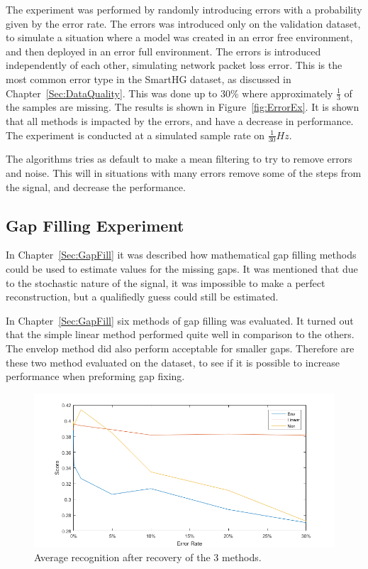 The experiment was performed by randomly introducing errors with a probability given by the error rate. The errors was introduced only on the validation dataset, to simulate a situation where a model was created in an error free environment, and then deployed in an error full environment. The errors is introduced independently of each other, simulating network packet loss error. This is the most common error type in the SmartHG dataset, as discussed in Chapter~\ref{Sec:DataQuality}.  This was done up to 30\% where approximately $\frac{1}{3}$ of the samples are missing. The results is shown in Figure~\ref{fig:ErrorEx}. It is shown that all methods is impacted by the errors, and have a decrease in performance. The experiment is conducted at a simulated sample rate on $\frac{1}{30} Hz$.

The algorithms tries as default to make a mean filtering to try to remove errors and noise. This will in situations with many errors remove some of the steps from the signal, and decrease the performance.  



\subsection{Gap Filling Experiment}
In Chapter~\ref{Sec:GapFill} it was described how mathematical gap filling methods could be used to estimate values for the missing gaps. It was mentioned that due to the stochastic nature of the signal, it was impossible to make a perfect reconstruction, but a qualifiedly guess could still be estimated.

In Chapter~\ref{Sec:GapFill} six methods of gap filling was evaluated. It turned out that the simple linear method performed quite well in comparison to the others. The envelop method did also perform acceptable for smaller gaps. Therefore are these two method evaluated on the  dataset, to see if it is possible to increase performance when preforming gap fixing. 


\begin{figure}[H]
\centering
\includegraphics[width=1\textwidth]{billeder/EcoRecError.png}
\caption{Average recognition after recovery of the 3 methods.}
\label{fig:GER}
\end{figure}

